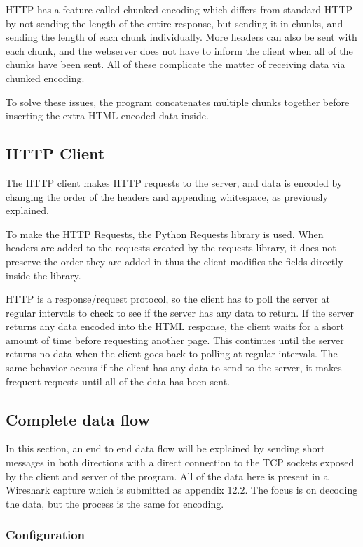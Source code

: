 HTTP has a feature called chunked encoding which differs from standard HTTP by not sending the length of the entire response, but sending it in chunks, and sending the length of each chunk individually.
More headers can also be sent with each chunk, and the webserver does not have to inform the client when all of the chunks have been sent. All of these complicate the matter of receiving data via chunked encoding.\par
To solve these issues, the program concatenates multiple chunks together before inserting the extra HTML-encoded data inside.

\subsection{HTTP Client}
The HTTP client makes HTTP requests to the server, and data is encoded by changing the order of the headers and appending whitespace, as previously explained.\par
To make the HTTP Requests, the Python Requests library is used. When headers are added to the requests created by the requests library, it does not preserve the order they are added in thus the client modifies the fields directly inside the library.\par
HTTP is a response/request protocol, so the client has to poll the server at regular intervals to check to see if the server has any data to return. If the server returns any data encoded into the HTML response, the client waits for a short amount of time before requesting another page. This continues until the server returns no data when the client goes back to polling at regular intervals. The same behavior occurs if the client has any data to send to the server, it makes frequent requests until all of the data has been sent.

\subsection{Complete data flow}
In this section, an end to end data flow will be explained by sending short messages in both directions with a direct connection to the TCP sockets exposed by the client and server of the program. All of the data here is present in a Wireshark capture which is submitted as appendix 12.2.
The focus is on decoding the data, but the process is the same for encoding.
\subsubsection{Configuration}

